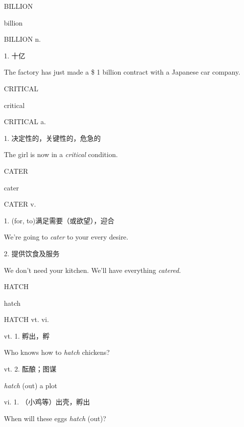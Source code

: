 \begin{flashcard}{
BILLION

billion
}
\begin{center}
BILLION n. 
\end{center}
1. 十亿

The factory has just made a \$ 1 billion contract with a Japanese car company.

\end{flashcard}
\begin{flashcard}{
CRITICAL

critical
}
\begin{center}
CRITICAL a. 
\end{center}
1. 决定性的，关键性的，危急的

The girl is now in a \textit{critical} condition.

\end{flashcard}
\begin{flashcard}{
CATER

cater
}
\begin{center}
CATER v. 
\end{center}
1. (for, to)满足需要（或欲望），迎合

We're going to \textit{cater} to your every desire.

2. 提供饮食及服务

We don't need your kitchen. We'll have everything \textit{catered}.

\end{flashcard}
\begin{flashcard}{
HATCH

hatch
}
\begin{center}
HATCH vt. vi. \textipa{[h\ae t\textesh]}
\end{center}
vt. 1. 孵出，孵

Who knows how to \textit{hatch} chickens?

vt. 2. 酝酿；图谋

\textit{hatch} (out) a plot

vi. 1. （小鸡等）出壳，孵出

When will these eggs \textit{hatch} (out)?

\end{flashcard}
